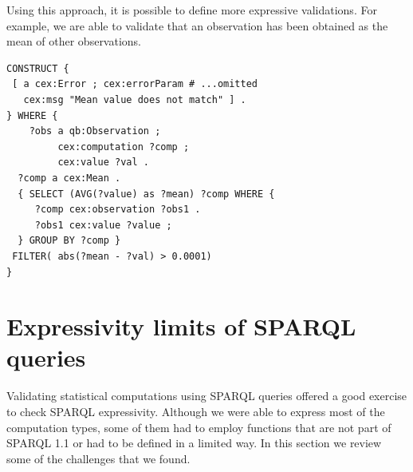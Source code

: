 \documentclass{acm_proc_article-sp}
\begin{document}
Using this approach, it is possible to define more expressive validations.
For example, we are able to validate that an observation has been obtained as
the mean of other observations. 

\begin{lstlisting}[style=SPARQL]
CONSTRUCT {
 [ a cex:Error ; cex:errorParam # ...omitted 
   cex:msg "Mean value does not match" ] . 
} WHERE { 
    ?obs a qb:Observation ;
         cex:computation ?comp ;
         cex:value ?val .
  ?comp a cex:Mean .
  { SELECT (AVG(?value) as ?mean) ?comp WHERE {
     ?comp cex:observation ?obs1 .
	 ?obs1 cex:value ?value ;
  } GROUP BY ?comp } 
 FILTER( abs(?mean - ?val) > 0.0001)
}
\end{lstlisting}

\section{Expressivity limits of SPARQL queries}

Validating statistical computations using SPARQL queries offered 
 a good exercise to check SPARQL expressivity. Although we were able 
 to express most of the computation types, some of them had to employ functions
 that are not part of SPARQL 1.1 or had to be defined in a limited way. 
 In this section we review some of the challenges that we found.
\end{document}
